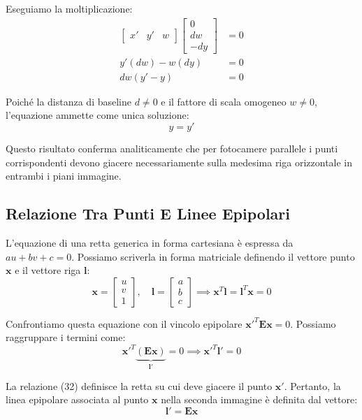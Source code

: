 ﻿\documentclass[11pt, a4paper]{article}
\begin{document}
Eseguiamo la moltiplicazione:
\begin{align*}
\begin{bmatrix} x' & y' & w \end{bmatrix} \begin{bmatrix} 0 \\ dw \\ -dy \end{bmatrix} &= 0 \\
y'(dw) - w(dy) &= 0 \\
d w (y' - y) &= 0
\end{align*}

Poiché la distanza di baseline $d \neq 0$ e il fattore di scala omogeneo $w \neq 0$, l'equazione ammette come unica soluzione:
\begin{equation}
\boxed{y = y'}
\end{equation}

Questo risultato conferma analiticamente che per fotocamere parallele i punti corrispondenti devono giacere necessariamente sulla medesima riga orizzontale in entrambi i piani immagine.



\subsection{Relazione Tra Punti E Linee Epipolari}

L'equazione di una retta generica in forma cartesiana è espressa da $au + bv + c = 0$. Possiamo scriverla in forma matriciale definendo il vettore punto $\bm{x}$ e il vettore riga $\bm{l}$:
\[
\bm{x} = \begin{bmatrix} u \\ v \\ 1 \end{bmatrix}, \quad \bm{l} = \begin{bmatrix} a \\ b \\ c \end{bmatrix} \implies \bm{x}^T \bm{l} = \bm{l}^T \bm{x} = 0
\]

Confrontiamo questa equazione con il vincolo epipolare $\bm{x}'^T \bm{E} \bm{x} = 0$. Possiamo raggruppare i termini come:
\begin{equation}
\bm{x}'^T \underbrace{\left(\bm{E} \bm{x}\right)}_{\bm{l}'} = 0 \implies \bm{x}'^T \bm{l}' = 0
\end{equation}

La relazione (32) definisce la retta su cui deve giacere il punto $\bm{x}'$. Pertanto, la linea epipolare associata al punto $\bm{x}$ nella seconda immagine è definita dal vettore:
\begin{equation}
\bm{l}' = \bm{E} \bm{x}
\end{equation}
\end{document}
